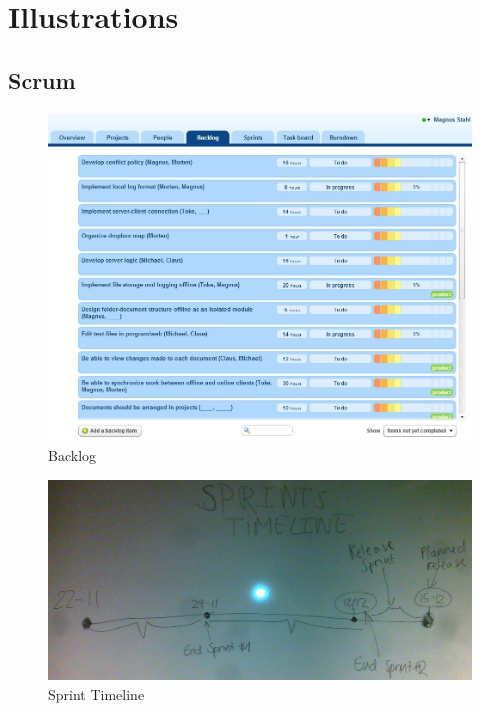 \section{Illustrations}
\subsection{Scrum}
\label{scrumillustrations}
\begin{figure}[H]
  \includegraphics[width=\textwidth,natwidth=985,natheight=765]{illustrations/backlog1.jpeg}
  \caption{Backlog}
  \label{backlog1}
\end{figure}
\begin{figure}[H]
  \includegraphics[width=\textwidth]{illustrations/04122012107.jpg}
  \caption{Sprint Timeline}
  \label{sprinttimeline}
\end{figure}
